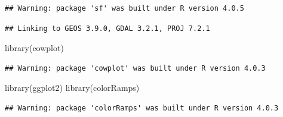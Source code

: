 \documentclass[
  10pt,
]{article}
\newenvironment{Shaded}{\begin{snugshade}}{\end{snugshade}}
\newcommand{\AttributeTok}[1]{\textcolor[rgb]{0.77,0.63,0.00}{#1}}
\newcommand{\ConstantTok}[1]{\textcolor[rgb]{0.00,0.00,0.00}{#1}}
\newcommand{\FunctionTok}[1]{\textcolor[rgb]{0.00,0.00,0.00}{#1}}
\newcommand{\NormalTok}[1]{#1}
\newcommand{\OtherTok}[1]{\textcolor[rgb]{0.56,0.35,0.01}{#1}}
\newcommand{\SpecialCharTok}[1]{\textcolor[rgb]{0.00,0.00,0.00}{#1}}
\newcommand{\StringTok}[1]{\textcolor[rgb]{0.31,0.60,0.02}{#1}}
\begin{document}
\begin{verbatim}
## Warning: package 'sf' was built under R version 4.0.5
\end{verbatim}

\begin{verbatim}
## Linking to GEOS 3.9.0, GDAL 3.2.1, PROJ 7.2.1
\end{verbatim}

\begin{Shaded}
\begin{Highlighting}[]
\FunctionTok{library}\NormalTok{(cowplot)}
\end{Highlighting}
\end{Shaded}

\begin{verbatim}
## Warning: package 'cowplot' was built under R version 4.0.3
\end{verbatim}

\begin{Shaded}
\begin{Highlighting}[]
\FunctionTok{library}\NormalTok{(ggplot2)}
\FunctionTok{library}\NormalTok{(colorRamps)}
\end{Highlighting}
\end{Shaded}

\begin{verbatim}
## Warning: package 'colorRamps' was built under R version 4.0.3
\end{verbatim}

\begin{Shaded}
\end{Shaded}
\end{document}
